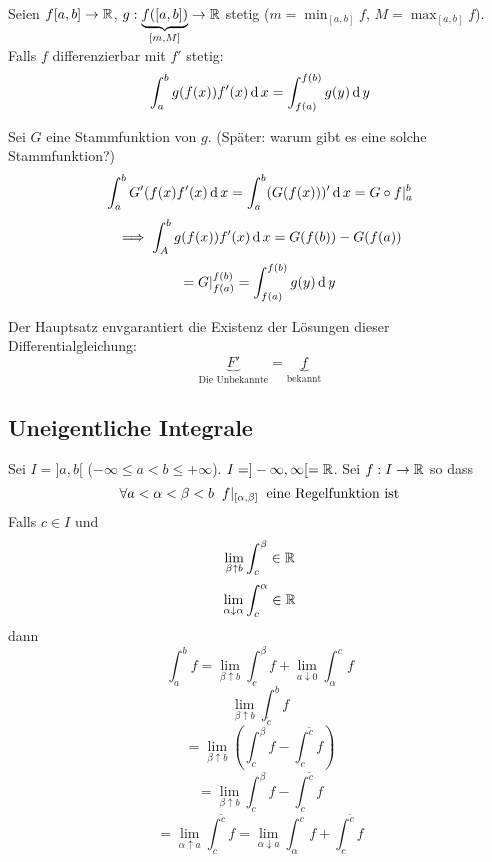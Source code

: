 \begin{Sat}
  Seien $f[a,b]\to\mathbb{R}$, $g:\underbrace{f([a,b])}_{[m,M]}\to\mathbb{R}$ stetig ($m=\min_{[a,b]}f$, $M=\max_{[a,b]}f$). Falls $f$ differenzierbar mit $f'$ stetig:
  \[\int_a^bg(f(x))f'(x)\operatorname{d} x=\int_{f(a)}^{f(b)}g(y)\operatorname{d} y\]
\end{Sat}
\begin{Bew}
  Sei $G$ eine Stammfunktion von $g$. (Später: warum gibt es eine solche Stammfunktion?)
  \[\int_a^bG'(f(x)f'(x)\operatorname{d} x=\int_a^b(G(f(x)))'\operatorname{d} x=G\circ f|_a^b\]
  \[\implies \int_A^bg(f(x))f'(x)\operatorname{d} x=G(f(b))-G(f(a))\]
  \[=G|_{f(a)}^{f(b)}=\int_{f(a)}^{f(b)}g(y)\operatorname{d} y\]
\end{Bew}
\begin{Bem}
  Der Hauptsatz envgarantiert die Existenz der Lösungen dieser Differentialgleichung:
  \[\underbrace{F'}_{\text{Die Unbekannte}}=\underbrace{f}_{\text{bekannt}}\]
\end{Bem}
\subsection{Uneigentliche Integrale}
\begin{Def}
  Sei $I=]a,b[$ ($-\infty\leq a<b\leq +\infty$). $I=]-\infty,\infty[=\mathbb{R}$. Sei $f:I\to\mathbb{R}$ so dass
  \[\forall a<\alpha<\beta<b\hspace{2mm} f|_{[\alpha,\beta]}\hspace{2mm}\text{eine Regelfunktion ist}\]
  Falls $c\in I$ und
  \[\lim_{\beta\uparrow b}\int_c^\beta\in\mathbb{R}\]
  \[\lim_{\alpha\downarrow \alpha}\int_c^\alpha\in\mathbb{R}\]
  dann
  \[\int_a^bf=\lim_{\beta\uparrow b}\int_c^\beta f+\lim_{a\downarrow 0}\int_\alpha^cf\]
  \[\lim_{\beta\uparrow b}\int_{\tilde c}^bf\]
  \[=\lim_{\beta\uparrow b}\left( \int_c^\beta f-\int_c^{\tilde c}f \right)\]
  \[=\lim_{\beta\uparrow b}\int_c^\beta f-\int_c^{\tilde c}f\]
  \[=\lim_{\alpha\uparrow a}\int_c^{\tilde c}f=\lim_{\alpha\downarrow a}\int_\alpha^cf+\int_c^{\tilde c}f\]
\end{Def}
